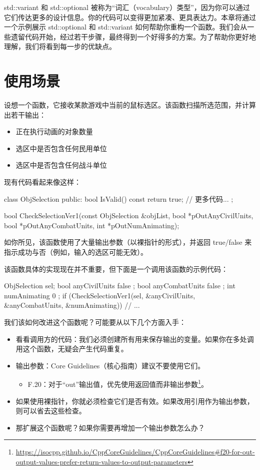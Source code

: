 
std::variant 和 std::optional 被称为“词汇（vocabulary）类型”，因为你可以通过它们传达更多的设计信息。你的代码可以变得更加紧凑、更具表达力。本章将通过一个示例展示 std::optional 和 std::variant 如何帮助你重构一个函数。我们会从一些遗留代码开始，经过若干步骤，最终得到一个好得多的方案。为了帮助你更好地理解，我们将看到每一步的优缺点。

\section{使用场景}

设想一个函数，它接收某款游戏中当前的鼠标选区。该函数扫描所选范围，并计算出若干输出：

\begin{itemize}
\item 正在执行动画的对象数量
\item 选区中是否包含任何民用单位
\item 选区中是否包含任何战斗单位
\end{itemize}

现有代码看起来像这样：

\begin{codebox}[cpp]
class ObjSelection
{
public:
    bool IsValid() const { return true; }
    // 更多代码...
};

bool CheckSelectionVer1(const ObjSelection &objList,
                        bool *pOutAnyCivilUnits,
                        bool *pOutAnyCombatUnits,
                        int *pOutNumAnimating);
\end{codebox}

如你所见，该函数使用了大量输出参数（以裸指针的形式），并返回 true/false 来指示成功与否（例如，输入的选区可能无效）。

该函数具体的实现现在并不重要，但下面是一个调用该函数的示例代码：

\begin{codebox}[cpp]
ObjSelection sel;
bool anyCivilUnits { false };
bool anyCombatUnits { false };
int numAnimating { 0 };
if (CheckSelectionVer1(sel, &anyCivilUnits, &anyCombatUnits, &numAnimating))
{
    // ...
}
\end{codebox}

我们该如何改进这个函数呢？可能要从以下几个方面入手：

\begin{itemize}
\item 看看调用方的代码：我们必须创建所有用来保存输出的变量。如果你在多处调用这个函数，无疑会产生代码重复。
\item 输出参数：Core Guidelines（核心指南）建议不要使用它们。
  \begin{itemize}
  \item F.20：对于“out”输出值，优先使用返回值而非输出参数\footnote{\url{https://isocpp.github.io/CppCoreGuidelines/CppCoreGuidelines\#f20-for-out-output-values-prefer-return-values-to-output-parameters}}。
  \end{itemize}
\item 如果使用裸指针，你就必须检查它们是否有效。如果改用引用作为输出参数，则可以省去这些检查。
\item 那扩展这个函数呢？如果你需要再增加一个输出参数怎么办？
\end{itemize}


